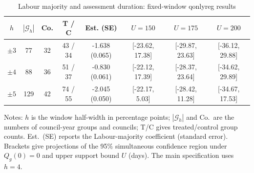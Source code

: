 \begin{table}[!h]
\centering
\begin{threeparttable}
\caption{Labour majority and assessment duration: fixed-window qonlyreg results}
\label{tab:qonlyreg_main}
{
\renewcommand{\arraystretch}{1.8}
\begin{tabular}{cccccccc}
\toprule
$h$ & $|\mathcal G_h|$ & Co. & T / C & Est. (SE) & $U=150$ & $U=175$ & $U=200$ \\
\midrule
$\pm 3$ & 77 & 32 & 43 / 34 & -1.638 (0.065) & [-23.62, 17.38] & [-29.87, 23.63] & [-36.12, 29.88] \\
$\pm 4$ & 88 & 36 & 51 / 37 & -0.830 (0.061) & [-22.12, 17.39] & [-28.37, 23.64] & [-34.62, 29.89] \\
$\pm 5$ & 129 & 42 & 74 / 55 & -2.045 (0.050) & [-22.17, 5.03] & [-28.42, 11.28] & [-34.67, 17.53] \\
\bottomrule
\end{tabular}
}
\begin{tablenotes}[flushleft]
{}
\item Notes: $h$ is the window half-width in percentage points; $|\mathcal G_h|$ and Co.\ are the numbers of council-year groups and councils; T/C gives treated/control group counts. Est.\ (SE) reports the Labour-majority coefficient (standard error). Brackets give projections of the 95\% simultaneous confidence region under $Q_g(0)=0$ and upper support bound $U$ (days). The main specification uses $h=4$.
\end{tablenotes}
\end{threeparttable}
\end{table}
